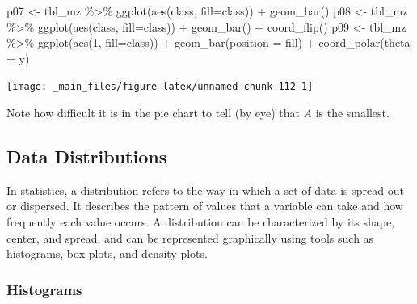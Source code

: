 \documentclass[
]{book}
\newenvironment{Shaded}{\begin{snugshade}}{\end{snugshade}}
\newcommand{\AttributeTok}[1]{\textcolor[rgb]{0.77,0.63,0.00}{#1}}
\newcommand{\DecValTok}[1]{\textcolor[rgb]{0.00,0.00,0.81}{#1}}
\newcommand{\FunctionTok}[1]{\textcolor[rgb]{0.00,0.00,0.00}{#1}}
\newcommand{\NormalTok}[1]{#1}
\newcommand{\OtherTok}[1]{\textcolor[rgb]{0.56,0.35,0.01}{#1}}
\newcommand{\SpecialCharTok}[1]{\textcolor[rgb]{0.00,0.00,0.00}{#1}}
\newcommand{\StringTok}[1]{\textcolor[rgb]{0.31,0.60,0.02}{#1}}
\begin{document}
\begin{Shaded}
\begin{Highlighting}[]
\NormalTok{p07 }\OtherTok{\textless{}{-}}\NormalTok{ tbl\_mz }\SpecialCharTok{\%\textgreater{}\%} \FunctionTok{ggplot}\NormalTok{(}\FunctionTok{aes}\NormalTok{(class, }\AttributeTok{fill=}\NormalTok{class)) }\SpecialCharTok{+} \FunctionTok{geom\_bar}\NormalTok{()}
\NormalTok{p08 }\OtherTok{\textless{}{-}}\NormalTok{ tbl\_mz }\SpecialCharTok{\%\textgreater{}\%} \FunctionTok{ggplot}\NormalTok{(}\FunctionTok{aes}\NormalTok{(class, }\AttributeTok{fill=}\NormalTok{class)) }\SpecialCharTok{+} \FunctionTok{geom\_bar}\NormalTok{() }\SpecialCharTok{+} \FunctionTok{coord\_flip}\NormalTok{()}
\NormalTok{p09 }\OtherTok{\textless{}{-}}\NormalTok{ tbl\_mz }\SpecialCharTok{\%\textgreater{}\%} \FunctionTok{ggplot}\NormalTok{(}\FunctionTok{aes}\NormalTok{(}\DecValTok{1}\NormalTok{, }\AttributeTok{fill=}\NormalTok{class)) }\SpecialCharTok{+} \FunctionTok{geom\_bar}\NormalTok{(}\AttributeTok{position =} \StringTok{\textquotesingle{}fill\textquotesingle{}}\NormalTok{) }\SpecialCharTok{+} \FunctionTok{coord\_polar}\NormalTok{(}\AttributeTok{theta =} \StringTok{\textquotesingle{}y\textquotesingle{}}\NormalTok{)}
\end{Highlighting}
\end{Shaded}

\begin{center}\texttt{[image: \_main\_files/figure-latex/unnamed-chunk-112-1]} \end{center}

Note how difficult it is in the pie chart to tell (by eye) that \emph{A} is the smallest.

\hypertarget{data-distributions}{%
\subsection{Data Distributions}\label{data-distributions}}

In statistics, a distribution refers to the way in which a set of data is spread out or dispersed. It describes the pattern of values that a variable can take and how frequently each value occurs. A distribution can be characterized by its shape, center, and spread, and can be represented graphically using tools such as histograms, box plots, and density plots.

\hypertarget{histograms}{%
\subsubsection*{Histograms}\label{histograms}}
\end{document}
